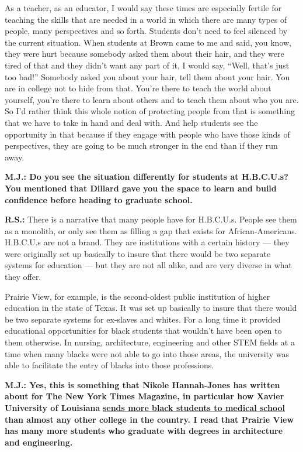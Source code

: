 As a teacher, as an educator, I would say these times are especially
fertile for teaching the skills that are needed in a world in which
there are many types of people, many perspectives and so forth. Students
don't need to feel silenced by the current situation. When students at
Brown came to me and said, you know, they were hurt because somebody
asked them about their hair, and they were tired of that and they didn't
want any part of it, I would say, ``Well, that's just too bad!''
Somebody asked you about your hair, tell them about your hair. You are
in college not to hide from that. You're there to teach the world about
yourself, you're there to learn about others and to teach them about who
you are. So I'd rather think this whole notion of protecting people from
that is something that we have to take in hand and deal with. And help
students see the opportunity in that because if they engage with people
who have those kinds of perspectives, they are going to be much stronger
in the end than if they run away.

\textbf{M.J.: Do you see the situation differently for students at
H.B.C.U.s? You mentioned that Dillard gave you the space to learn and
build confidence before heading to graduate school.}

\textbf{R.S.:} There is a narrative that many people have for H.B.C.U.s.
People see them as a monolith, or only see them as filling a gap that
exists for African-Americans. H.B.C.U.s are not a brand. They are
institutions with a certain history --- they were originally set up
basically to insure that there would be two separate systems for
education --- but they are not all alike, and are very diverse in what
they offer.

Prairie View, for example, is the second-oldest public institution of
higher education in the state of Texas. It was set up basically to
insure that there would be two separate systems for ex-slaves and
whites. For a long time it provided educational opportunities for black
students that wouldn't have been open to them otherwise. In nursing,
architecture, engineering and other STEM fields at a time when many
blacks were not able to go into those areas, the university was able to
facilitate the entry of blacks into those professions.

\textbf{M.J.: Yes, this is something that Nikole Hannah-Jones has
written about for The New York Times Magazine, in particular how Xavier
University of Louisiana}
\textbf{\href{https://www.nytimes.com/2015/09/13/magazine/a-prescription-for-more-black-doctors.html}{sends
more black students to medical school}} \textbf{than almost any other
college in the country. I read that Prairie View has many more students
who graduate with degrees in architecture and engineering.}

